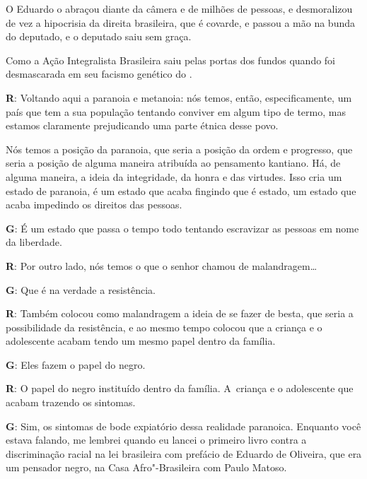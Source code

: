  

O Eduardo o abraçou diante da câmera e de milhões de pessoas, e
desmoralizou de vez a hipocrisia da direita brasileira, que é covarde, e
passou a mão na bunda do deputado, e o deputado saiu sem graça.

 

Como a Ação Integralista Brasileira saiu pelas portas dos fundos quando
foi desmascarada em seu facismo genético do .

 

\textbf{R}: Voltando aqui a paranoia e metanoia: nós temos, então,
especificamente, um país que tem a sua população tentando conviver em
algum tipo de termo, mas estamos claramente prejudicando uma parte
étnica desse povo.

 

Nós temos a posição da paranoia, que seria a posição da ordem e
progresso, que seria a posição de alguma maneira atribuída ao pensamento
kantiano. Há, de alguma maneira, a ideia da integridade, da honra e das
virtudes. Isso cria um estado de paranoia, é um estado que acaba
fingindo que é estado, um estado que acaba impedindo os direitos das
pessoas.

 

\textbf{G}: É um estado que passa o tempo todo tentando escravizar as
pessoas em nome da liberdade.

 

\textbf{R}: Por outro lado, nós temos o que o senhor chamou de
malandragem…

 

\textbf{G}: Que é na verdade a resistência.

 

\textbf{R}: Também colocou como malandragem a ideia de se fazer de
besta, que seria a possibilidade da resistência, e ao mesmo tempo
colocou que a criança e o adolescente acabam tendo um mesmo papel dentro
da família.

 

\textbf{G}: Eles fazem o papel do negro.

 

\textbf{R}: O papel do negro instituído dentro da família. A~criança e o
adolescente que acabam trazendo os sintomas.

 

\textbf{G}: Sim, os sintomas de bode expiatório dessa realidade
paranoica. Enquanto você estava falando, me lembrei quando eu lancei o
primeiro livro contra a discriminação racial na lei brasileira com
prefácio de Eduardo de Oliveira, que era um pensador negro, na Casa
Afro"-Brasileira com Paulo Matoso.

